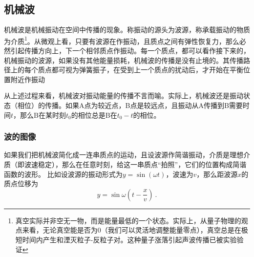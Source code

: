 
\subsection{机械波}
机械波是机械振动在空间中传播的现象。称振动的源头为波源，称承载振动的物质为介质\footnote{真空实际并非空无一物，而是能量最低的一个状态。实际上，从量子物理的观点来看，无论真空能是否为0（我们可以灵活地调整能量零点），真空总是在极短时间内产生和湮灭粒子-反粒子对。这种量子涨落引起声波传播已被实验验证}。从微观上看，只要有波源在作振动，且质点之间有弹性恢复力，那么必然引起传播方向上，下一个相邻质点作振动。每一个质点，都可以看作接下来的，机械振动的波源，如果没有其他能量损耗，机械波的传播是没有止境的。其传播路径上的每个质点都可视为弹簧振子，在受到上一个质点的扰动后，才开始在平衡位置附近作振动

从上述过程来看，机械波对振动能量的传播不言而喻。实际上，机械波还是振动状态（相位）的传播。如果A点为较近点，B点是较远点，且振动从A传播到B需要时间$t$，那么B在某时刻$t_0$的相位总是B在$t_0-t$的相位。
\subsubsection{波的图像}
如果我们把机械波简化成一连串质点的运动，且设波源作简谐振动，介质是理想介质（即波速稳定），那么在任意时刻，给这一串质点“拍照”，它们的位置构成简谐函数的波形。
比如设波源的振动形式为$y=\sin(\omega t)$，波速为$v$，那么距波源$x$的质点位移为
\begin{equation}
y=\sin \omega (t-\frac{x}{v})~.
\end{equation}
